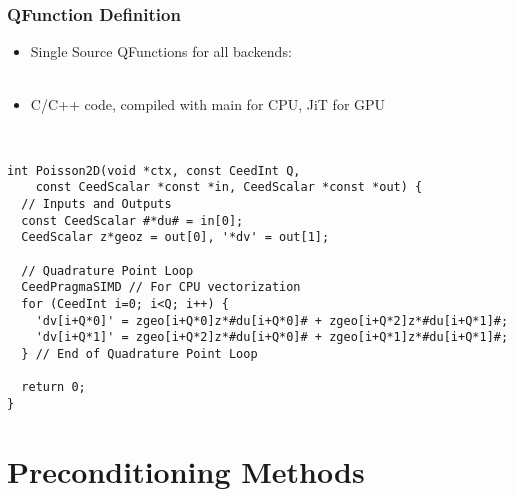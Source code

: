 \documentclass{beamer}
\begin{document}
\begin{frame}[fragile]
\begin{center}
\frametitle{QFunction Definition}

\begin{itemize}

\item Single Source QFunctions for all backends:\\

~\\

\item C/C++ code, compiled with main for CPU, JiT for GPU\\

\end{itemize}

~\\

{\scriptsize
\begin{lstlisting}[style=qfunc]
int Poisson2D(void *ctx, const CeedInt Q,
    const CeedScalar *const *in, CeedScalar *const *out) {
  // Inputs and Outputs
  const CeedScalar #*du# = in[0];
  CeedScalar z*geoz = out[0], '*dv' = out[1];

  // Quadrature Point Loop
  CeedPragmaSIMD // For CPU vectorization
  for (CeedInt i=0; i<Q; i++) {
    'dv[i+Q*0]' = zgeo[i+Q*0]z*#du[i+Q*0]# + zgeo[i+Q*2]z*#du[i+Q*1]#;
    'dv[i+Q*1]' = zgeo[i+Q*2]z*#du[i+Q*0]# + zgeo[i+Q*1]z*#du[i+Q*1]#;
  } // End of Quadrature Point Loop

  return 0;
}
\end{lstlisting}
}

\end{center}
\end{frame}

\fi

\section{Preconditioning Methods}
\end{document}
